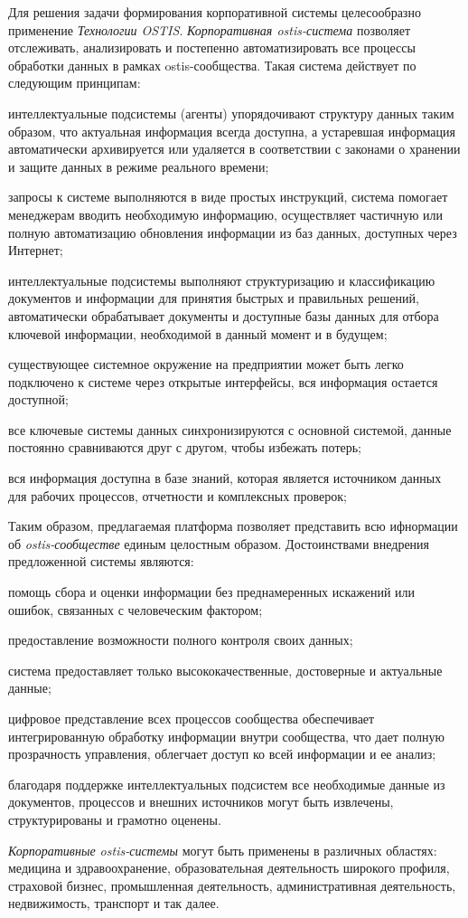 Для решения задачи формирования корпоративной системы целесообразно применение \textit{Технологии OSTIS}. \textit{Корпоративная ostis-система} позволяет отслеживать, анализировать и постепенно автоматизировать все процессы обработки данных в рамках ostis-сообщества. 
Такая система действует по следующим принципам:
\begin{textitemize}
    \item интеллектуальные подсистемы (агенты) упорядочивают структуру данных таким образом, что актуальная информация всегда доступна, а устаревшая информация автоматически архивируется или удаляется в соответствии с законами о хранении и защите данных в режиме реального времени;
    \item запросы к системе выполняются в виде простых инструкций, система помогает менеджерам вводить необходимую информацию, осуществляет частичную или полную автоматизацию обновления информации из баз данных, доступных через Интернет;
    \item интеллектуальные подсистемы выполняют структуризацию и классификацию документов и информации для принятия быстрых и правильных решений, автоматически обрабатывает документы и доступные базы данных для отбора ключевой информации, необходимой в данный момент и в будущем;
    \item существующее системное окружение на предприятии может быть легко подключено к системе через открытые интерфейсы, вся информация остается доступной;
    \item все ключевые системы данных синхронизируются с основной системой, данные постоянно сравниваются друг с другом, чтобы избежать потерь;
    \item вся информация доступна в базе знаний, которая является источником данных для рабочих процессов, отчетности и комплексных проверок;
\end{textitemize}

Таким образом, предлагаемая платформа позволяет представить всю ифнормации об \textit{ostis-сообществе} единым целостным образом. 
Достоинствами внедрения предложенной системы являются:
\begin{textitemize}
    \item помощь сбора и оценки информации без преднамеренных искажений или ошибок, связанных с человеческим фактором;
    \item предоставление возможности полного контроля своих данных;
    \item система предоставляет только высококачественные, достоверные и актуальные данные;
    \item цифровое представление всех процессов сообщества обеспечивает интегрированную обработку информации внутри сообщества, что дает полную прозрачность управления, облегчает доступ ко всей информации и ее анализ;
    \item благодаря поддержке интеллектуальных подсистем все необходимые данные из документов, процессов и внешних источников могут быть извлечены, структурированы и грамотно оценены.
\end{textitemize}

\textit{Корпоративные ostis-системы} могут быть применены в различных областях: медицина и здравоохранение, образовательная деятельность широкого профиля, страховой бизнес, промышленная деятельность, административная деятельность, недвижимость, транспорт и так далее.
